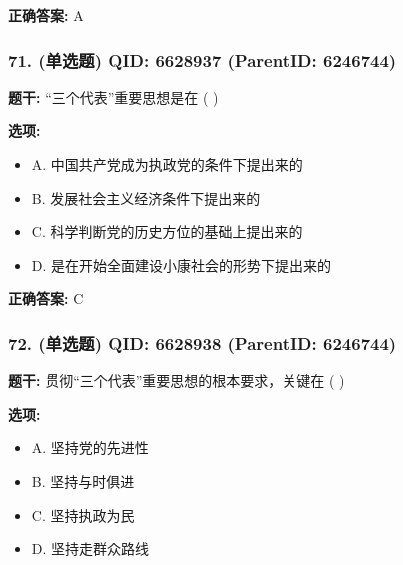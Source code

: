 \documentclass[12pt,UTF8]{ctexart}
\begin{document}
\textbf{正确答案:}
A

\vspace{0.3em}\hrulefill\vspace{0.7em}

\subsubsection*{71. (单选题) \small QID: 6628937 (ParentID: 6246744)}

\textbf{题干:}
“三个代表”重要思想是在  ( )



\textbf{选项:}
\begin{itemize}[leftmargin=*]

  \item A. 中国共产党成为执政党的条件下提出来的

  \item B. 发展社会主义经济条件下提出来的

  \item C. 科学判断党的历史方位的基础上提出来的

  \item D. 是在开始全面建设小康社会的形势下提出来的

\end{itemize}

\textbf{正确答案:}
C

\vspace{0.3em}\hrulefill\vspace{0.7em}

\subsubsection*{72. (单选题) \small QID: 6628938 (ParentID: 6246744)}

\textbf{题干:}
贯彻“三个代表”重要思想的根本要求，关键在  ( )



\textbf{选项:}
\begin{itemize}[leftmargin=*]

  \item A. 坚持党的先进性

  \item B. 坚持与时俱进

  \item C. 坚持执政为民

  \item D. 坚持走群众路线

\end{itemize}
\end{document}
